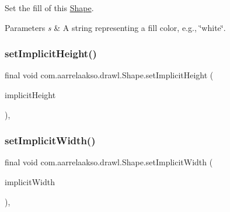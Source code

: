 Set the fill of this \hyperlink{classcom_1_1aarrelaakso_1_1drawl_1_1_shape}{Shape}. 


\begin{DoxyParams}{Parameters}
{\em s} & A string representing a fill color, e.\+g., \char`\"{}white\char`\"{}. \\
\hline
\end{DoxyParams}
\mbox{\label{classcom_1_1aarrelaakso_1_1drawl_1_1_shape_acb96a96a1d43132def75a38c136c563f}} 
\subsubsection{\texorpdfstring{set\+Implicit\+Height()}{setImplicitHeight()}}
{\footnotesize\ttfamily final void com.\+aarrelaakso.\+drawl.\+Shape.\+set\+Implicit\+Height (\begin{DoxyParamCaption}\item[{\hyperlink{classcom_1_1aarrelaakso_1_1drawl_1_1_drawl_number}{Drawl\+Number}}]{implicit\+Height }\end{DoxyParamCaption})\hspace{0.3cm}{\ttfamily [protected]}, {\ttfamily [inherited]}}

\mbox{\label{classcom_1_1aarrelaakso_1_1drawl_1_1_shape_a03a408248a797d817ab32d5b833d5e1d}} 
\subsubsection{\texorpdfstring{set\+Implicit\+Width()}{setImplicitWidth()}}
{\footnotesize\ttfamily final void com.\+aarrelaakso.\+drawl.\+Shape.\+set\+Implicit\+Width (\begin{DoxyParamCaption}\item[{\hyperlink{classcom_1_1aarrelaakso_1_1drawl_1_1_drawl_number}{Drawl\+Number}}]{implicit\+Width }\end{DoxyParamCaption})\hspace{0.3cm}{\ttfamily [protected]}, {\ttfamily [inherited]}}

